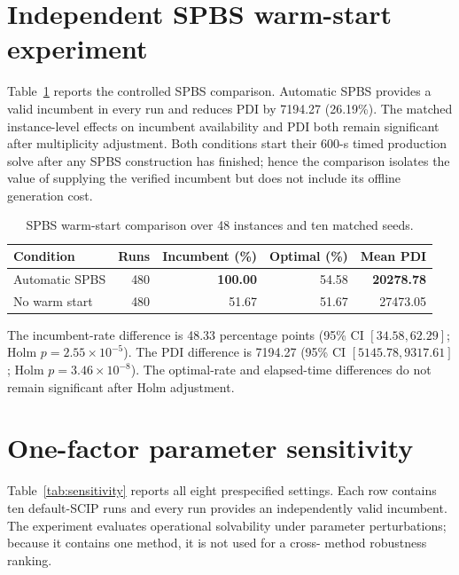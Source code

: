 \documentclass[11pt]{article}
\begin{document}
\section{Independent SPBS warm-start experiment}

Table~\ref{tab:spbs} reports the controlled SPBS comparison. Automatic SPBS
provides a valid incumbent in every run and reduces PDI by 7194.27 (26.19\%).
The matched instance-level effects on incumbent availability and PDI both
remain significant after multiplicity adjustment. Both conditions start their
600-s timed production solve after any SPBS construction has finished; hence
the comparison isolates the value of supplying the verified incumbent but
does not include its offline generation cost.

\begin{table}[htbp]
\centering
\caption{SPBS warm-start comparison over 48 instances and ten matched seeds.}
\label{tab:spbs}
\begin{tabular}{lrrrr}
\toprule
Condition & Runs & Incumbent (\%) & Optimal (\%) & Mean PDI \\
\midrule
Automatic SPBS & 480 & \textbf{100.00} & 54.58 & \textbf{20278.78} \\
No warm start & 480 & 51.67 & 51.67 & 27473.05 \\
\bottomrule
\end{tabular}
\end{table}

The incumbent-rate difference is 48.33 percentage points (95\% CI
$[34.58,62.29]$; Holm $p=2.55\times10^{-5}$). The PDI difference is 7194.27
(95\% CI $[5145.78,9317.61]$; Holm $p=3.46\times10^{-8}$). The optimal-rate
and elapsed-time differences do not remain significant after Holm adjustment.

\section{One-factor parameter sensitivity}

Table~\ref{tab:sensitivity} reports all eight prespecified settings. Each row
contains ten default-SCIP runs and every run provides an independently valid
incumbent. The experiment evaluates operational solvability under parameter
perturbations; because it contains one method, it is not used for a cross-
method robustness ranking.
\end{document}

